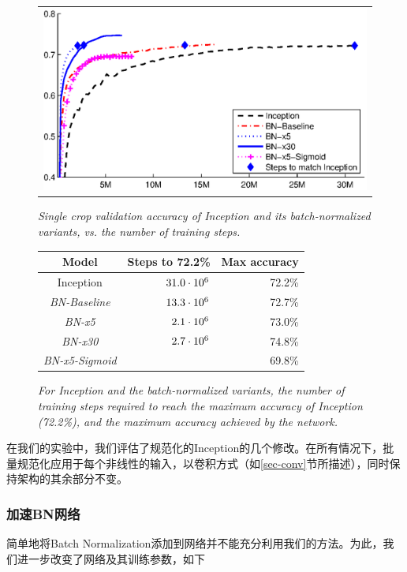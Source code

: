 \documentclass[twocolumn]{article}
\begin{document}
\begin{figure}
\centering
\begin{minipage}[b]{\columnwidth}
\begin{tabular}{@{}c@{}}
\includegraphics[width=\columnwidth]{inception-compare.eps}
\end{tabular} 
\caption{\em Single crop validation accuracy of Inception and its
  batch-normalized variants, vs. the number of training steps.  }
\label{fig-inception}
\end{minipage}
\qquad
%
\begin{minipage}[b]{0.9\columnwidth}
\begin{tabular}{@{} c | r  r  @{}}
\hline
Model & Steps to  72.2\% & Max accuracy \\ 
\hline
Inception& $31.0\cdot 10^6$ & 72.2\%  \\
\sl BN-Baseline& $13.3\cdot 10^6$ & 72.7\%  \\
\sl BN-x5& $2.1\cdot 10^6$ & 73.0\%  \\
\sl BN-x30& $2.7\cdot 10^6$ & 74.8\% \\
\sl BN-x5-Sigmoid&  & 69.8\%\\\hline
\end{tabular}
\caption{\em For Inception and the batch-normalized variants, the number of training steps required to reach the maximum accuracy of Inception (72.2\%), and the maximum accuracy achieved by the network.}
\label{fig-stats}
\end{minipage}
\end{figure}

在我们的实验中，我们评估了规范化的Inception的几个修改。在所有情况下，批量规范化应用于每个非线性的输入，以卷积方式（如\ref{sec-conv}节所描述），同时保持架构的其余部分不变。

\subsubsection{加速BN网络}
\label{sec-accelerating}
简单地将Batch Normalization添加到网络并不能充分利用我们的方法。为此，我们进一步改变了网络及其训练参数，如下
\end{document}
